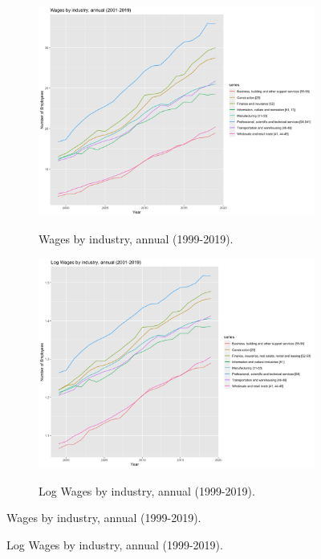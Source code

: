 \documentclass[12pt]{article}
\begin{document}
\begin{figure}[h!]
\centering
\begin{subfigure}{.5\textwidth}
  \centering
\includegraphics[scale=0.25]{wages.png}
\label{}
\caption{Wages by industry, annual (1999-2019).}
\end{subfigure}%
\begin{subfigure}{.5\textwidth}
  \centering
\includegraphics[scale=0.25]{log_wages.png}
\label{}
\caption{Log Wages by industry, annual (1999-2019).}
\end{subfigure}
\captionsetup{textformat=empty,labelformat=blank}
\caption{Wages by industry, annual (1999-2019).}
\caption{Log Wages by industry, annual (1999-2019).}
\end{figure}
\end{document}
